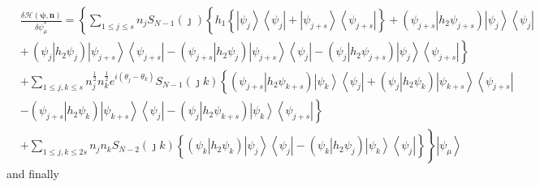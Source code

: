 \documentclass[aps,preprint]{revtex4}%
\begin{document}
\begin{align}
&  \frac{\delta\mathcal{H}\left(  \mathbf{\psi,n}\right)  }{\delta\psi_{\mu
}^{\ast}}=\left\{  \sum_{1\leq j\leq s}n_{j}S_{N-1}\left(  \jmath\right)
\left\{  h_{1}\left\{  \left\vert \psi_{j}\right\rangle \left\langle \psi
_{j}\right\vert +\left\vert \psi_{j+s}\right\rangle \left\langle \psi
_{j+s}\right\vert \right\}  +\left(  \left.  \psi_{j+s}\right\vert h_{2}%
\psi_{j+s}\right)  \left\vert \psi_{j}\right\rangle \left\langle \psi
_{j}\right\vert \right.  \right.  \nonumber\\
&  \left.  +\,\left(  \left.  \psi_{j}\right\vert h_{2}\psi_{j}\right)
\left\vert \psi_{j+s}\right\rangle \left\langle \psi_{j+s}\right\vert -\left(
\left.  \psi_{j+s}\right\vert h_{2}\psi_{j}\right)  \left\vert \psi
_{j+s}\right\rangle \left\langle \psi_{j}\right\vert -\left(  \left.  \psi
_{j}\right\vert h_{2}\psi_{j+s}\right)  \left\vert \psi_{j}\right\rangle
\left\langle \psi_{j+s}\right\vert \right\}  \nonumber\\
&  +\sum_{1\leq j,k\leq s}n_{j}^{\frac{1}{2}}n_{k}^{\frac{1}{2}}e^{i\left(
\theta_{j}-\theta_{k}\right)  }S_{N-1}\left(  \jmath k\right)  \left\{
\left(  \left.  \psi_{j+s}\right\vert h_{2}\psi_{k+s}\right)  \left\vert
\psi_{k}\right\rangle \left\langle \psi_{j}\right\vert +\left(  \left.
\psi_{j}\right\vert h_{2}\psi_{k}\right)  \left\vert \psi_{k+s}\right\rangle
\left\langle \psi_{j+s}\right\vert \right.  \nonumber\\
&  \left.  -\left(  \left.  \psi_{j+s}\right\vert h_{2}\psi_{k}\right)
\left\vert \psi_{k+s}\right\rangle \left\langle \psi_{j}\right\vert -\left(
\left.  \psi_{j}\right\vert h_{2}\psi_{k+s}\right)  \left\vert \psi
_{k}\right\rangle \left\langle \psi_{j+s}\right\vert \right\}  \nonumber\\
&  +\sum_{1\leq j,k\leq2s}n_{j}n_{k}S_{N-2}\left(  \jmath k\right)  \left.
\overset{}{\left\{  \left(  \left.  \psi_{k}\right\vert h_{2}\psi_{k}\right)
\left\vert \psi_{j}\right\rangle \left\langle \psi_{j}\right\vert -\left(
\left.  \psi_{k}\right\vert h_{2}\psi_{j}\right)  \left\vert \psi
_{k}\right\rangle \left\langle \psi_{j}\right\vert \right\}  }\right\}
\left\vert \psi_{\mu}\right\rangle \label{der1}%
\end{align}
and finally
\end{document}
